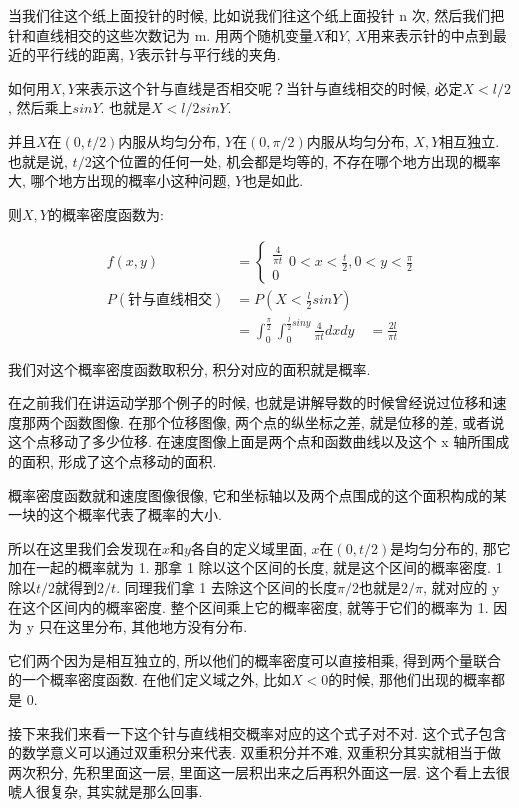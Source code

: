 当我们往这个纸上面投针的时候, 比如说我们往这个纸上面投针 n 次, 然后我们把针和直线相交的这些次数记为 m. 用两个随机变量$X$和$Y$, $X$用来表示针的中点到最近的平行线的距离, $Y$表示针与平行线的夹角. 

如何用$X, Y$来表示这个针与直线是否相交呢？当针与直线相交的时候, 必定$X < l/2$, 然后乘上$sinY$. 也就是$X < l / 2sinY$. 

并且$X$在$(0, t/2)$内服从均匀分布, $Y$在$(0, \pi/2)$内服从均匀分布, $X, Y$相互独立. 也就是说, $t/2$这个位置的任何一处, 机会都是均等的, 不存在哪个地方出现的概率大, 哪个地方出现的概率小这种问题, $Y$也是如此. 

则$X, Y$的概率密度函数为: 

\begin{align*}
  f(x,y) &  = \begin{cases} 
  \frac{4}{\pi t} \\ 0 
  \end{cases} 
  0 < x < \frac{t}{2}, 0 < y < \frac{\pi}{2} \\
  P(\mbox{针与直线相交}) &  = P(X < \frac{l}{2}sinY) \\
  & = \int_0^{\frac{\pi}{2}} \int_0^{\frac{l}{2}siny}\frac{4}{\pi t}dxdy 
  \quad = \frac{2l}{\pi t}
\end{align*}

我们对这个概率密度函数取积分, 积分对应的面积就是概率. 

在之前我们在讲运动学那个例子的时候, 也就是讲解导数的时候曾经说过位移和速度那两个函数图像. 在那个位移图像, 两个点的纵坐标之差, 就是位移的差, 或者说这个点移动了多少位移. 在速度图像上面是两个点和函数曲线以及这个 x 轴所围成的面积, 形成了这个点移动的面积. 

概率密度函数就和速度图像很像, 它和坐标轴以及两个点围成的这个面积构成的某一块的这个概率代表了概率的大小. 

所以在这里我们会发现在$x$和$y$各自的定义域里面, $x$在$(0, t/2)$是均匀分布的, 那它加在一起的概率就为 1. 那拿 1 除以这个区间的长度, 就是这个区间的概率密度. 1 除以$t/2$就得到$2/t$. 同理我们拿 1 去除这个区间的长度$\pi /2$也就是$2/\pi$, 就对应的 y 在这个区间内的概率密度. 整个区间乘上它的概率密度, 就等于它们的概率为 1. 因为 y 只在这里分布, 其他地方没有分布. 

它们两个因为是相互独立的, 所以他们的概率密度可以直接相乘, 得到两个量联合的一个概率密度函数. 在他们定义域之外, 比如$X < 0$的时候, 那他们出现的概率都是 0. 

接下来我们来看一下这个针与直线相交概率对应的这个式子对不对. 这个式子包含的数学意义可以通过双重积分来代表. 双重积分并不难, 双重积分其实就相当于做两次积分, 先积里面这一层, 里面这一层积出来之后再积外面这一层. 这个看上去很唬人很复杂, 其实就是那么回事. 

